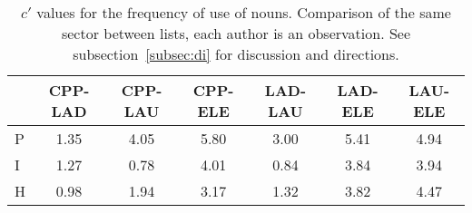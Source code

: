 \begin{table}
  \centering
  \caption{$c'$ values for the frequency of use of nouns. Comparison of the same sector between lists, each author is an observation. See subsection~\ref{subsec:di} for discussion and directions.}
  \begin{tabular}{l| c c c c c c}
& CPP-LAD & CPP-LAU & CPP-ELE & LAD-LAU & LAD-ELE & LAU-ELE \\\hline
P & 1.35 & 4.05 & 5.80 & 3.00 & 5.41 & 4.94 \\
I & 1.27 & 0.78 & 4.01 & 0.84 & 3.84 & 3.94 \\
H & 0.98 & 1.94 & 3.17 & 1.32 & 3.82 & 4.47 \\
  \end{tabular}
  \label{tab:kolSubInter}
\end{table}

